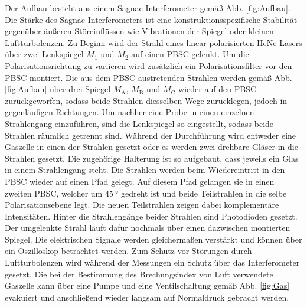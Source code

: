 Der Aufbau besteht aus einem Sagnac Interferometer gemäß Abb. \ref{fig:Aufbau}. Die Stärke des Sagnac Interferometers ist eine konstruktionsspezifische Stabilität gegenüber äußeren Störeinflüssen wie Vibrationen der Spiegel oder kleinen Luftturbolenzen. Zu Beginn wird der Strahl eines linear polarisierten HeNe Lasers über zwei Lenkspiegel $M_\text{1}$ und $M_\text{2}$ auf einen PBSC gelenkt. Um die Polarisationsrichtung zu variieren wird zusätzlich ein Polarisationsfilter vor den PBSC montiert. Die aus dem PBSC austretenden Strahlen werden gemäß Abb. \ref{fig:Aufbau} über drei Spiegel $M_\text{A}$, $M_\text{B}$ und $M_\text{C}$ wieder auf den PBSC zurückgeworfen, sodass beide Strahlen diesselben Wege zurücklegen, jedoch in gegenläufigen Richtungen. Um nachher eine Probe in einen einzelnen Strahlengang einzuführen, sind die Lenkspiegel so eingestellt, sodass beide Strahlen räumlich getrennt sind. Während der Durchführung wird entweder eine Gaszelle in einen der Strahlen gesetzt oder es werden zwei drehbare Gläser in die Strahlen gesetzt. Die zugehörige Halterung ist so aufgebaut, dass jeweils ein Glas in einem Strahlengang steht. %
Die Strahlen werden beim Wiedereintritt in den PBSC wieder auf einen Pfad gelegt. Auf diesem Pfad gelangen sie in einen zweiten PBSC, welcher um $\SI{45}{\degree}$ gedreht ist und beide Teilstrahlen in die selbe Polarisationsebene legt. 
Die neuen Teilstrahlen zeigen dabei komplementäre Intensitäten. Hinter die Strahlengänge beider Strahlen sind Photodioden gesetzt. Der umgelenkte Strahl läuft dafür nochmals über einen dazwischen montierten Spiegel. Die elektrischen Signale werden gleichermaßen verstärkt und können über ein Oszilloskop betrachtet werden. Zum Schutz vor Störungen durch Luftturbolenzen wird während der Messungen ein Schutz über das Interferometer gesetzt. Die bei der Bestimmung des Brechungsindex von Luft verwendete Gaszelle kann über eine Pumpe und eine Ventilschaltung gemäß Abb. \ref{fig:Gas} evakuiert und anschließend wieder langsam auf Normaldruck gebracht werden.

